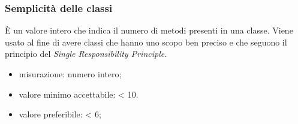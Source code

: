 	\subsubsection*{Semplicità delle classi}
	È un valore intero che indica il numero di metodi presenti in una classe. Viene usato al fine di avere classi che hanno uno scopo ben preciso e che seguono il principio del \textit{Single Responsibility Principle}.
		\begin{itemize}
			\item {misurazione: numero intero;}
			\item {valore minimo accettabile: < 10.}
			\item {valore preferibile: < 6;}
	\end{itemize}